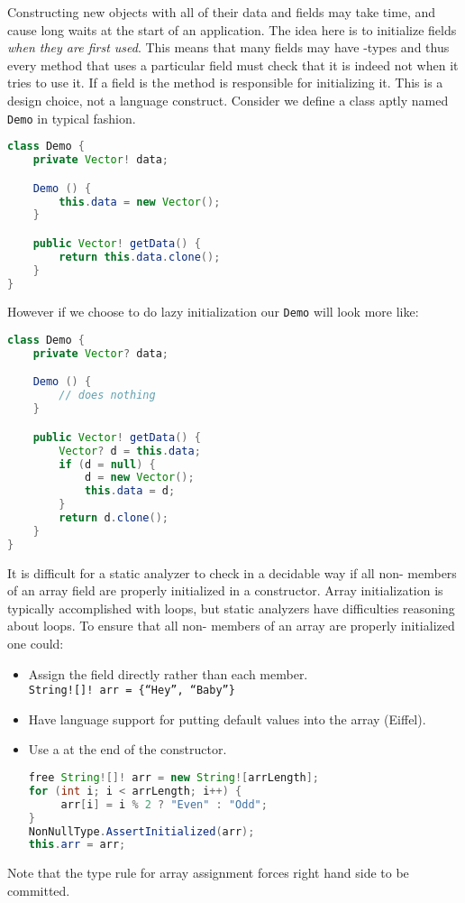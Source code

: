 \documentclass{article}
\begin{document}
\begin{definition}
  Constructing new objects with all of their data and fields may take time, and cause long waits at the start of an application.
  The idea here is to initialize fields \textit{when they are first used}.
  This means that many fields may have \cringe{}-types and thus every method that uses a particular field must check that it is indeed not \cringe{} when it tries to use it.
  If a field is \cringe{} the method is responsible for initializing it.
  This is a design choice, not a language construct.
  Consider we define a class aptly named \texttt{Demo} in typical fashion.
\begin{lstlisting}[escapechar=|, language=Java]
class Demo {
    private Vector! data;

    Demo () {
        this.data = new Vector();
    }

    public Vector! getData() {
        return this.data.clone();
    }
}
\end{lstlisting}
  However if we choose to do lazy initialization our \texttt{Demo} will look more like:
\begin{lstlisting}[escapechar=|, language=Java]
class Demo {
    private Vector? data;

    Demo () {
        // does nothing
    }

    public Vector! getData() {
        Vector? d = this.data;
        if (d = null) {
            d = new Vector();
            this.data = d;
        }
        return d.clone();
    }
}
\end{lstlisting}
\end{definition}

\begin{definition}
  It is difficult for a static analyzer to check in a decidable way if all non-\cringe{} members of an array field are properly initialized in a constructor.
  Array initialization is typically accomplished with loops, but static analyzers have difficulties reasoning about loops.
  To ensure that all non-\cringe{} members of an array are properly initialized one could:
  \begin{itemize}
  \item Assign the field directly rather than each member. \\
    \texttt{String![]! arr = \{``Hey'', ``Baby''\}}
  \item Have language support for putting default values into the array (Eiffel).
  \item Use a \runtimecheck{} at the end of the constructor.
\begin{lstlisting}[escapechar=|, language=Java]
free String![]! arr = new String![arrLength];
for (int i; i < arrLength; i++) {
     arr[i] = i % 2 ? "Even" : "Odd";
}
NonNullType.AssertInitialized(arr);
this.arr = arr;
\end{lstlisting}
  \end{itemize}
  Note that the type rule for array assignment forces right hand side to be committed.
\end{definition}
\end{document}
